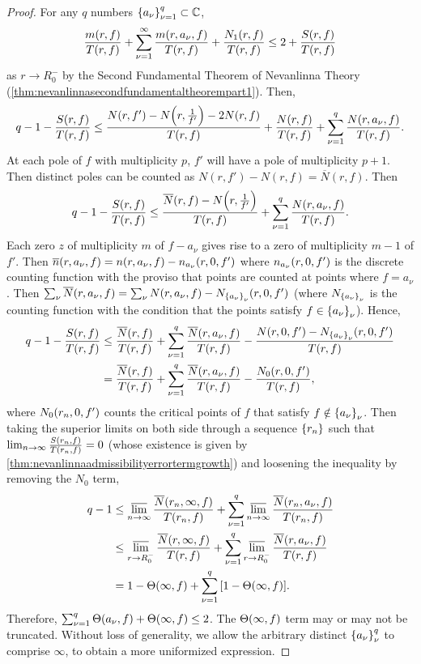\begin{proof}
    For any \(q\) numbers \(\qty{a_\nu}_{\nu=1}^q\subset\mathbb{C}\), \[\frac{m(r,f)}{T(r,f)}+\sum_{\nu=1}^\infty\frac{m\qty(r,a_\nu,f)}{T\qty(r,f)}+\frac{N_1(r,f)}{T(r,f)}\leq 2+\frac{S(r,f)}{T(r,f)}\] as \(r\to R_0^-\) by the Second Fundamental Theorem of Nevanlinna Theory (\cref{thm:nevanlinnasecondfundamentaltheorempart1}). Then, \[q-1-\frac{S(r,f)}{T(r,f)}\leq\frac{N(r,f')-N\qty(r,\tfrac1{f'})-2N(r,f)}{T(r,f)}+\frac{N\qty(r,f)}{T(r,f)}+\sum_{\nu=1}^q\frac{N\qty(r,a_\nu,f)}{T(r,f)}.\]
    At each pole of \(f\) with multiplicity \(p\), \(f'\) will have a pole of multiplicity \(p+1\). Then distinct poles can be counted as \(N(r,f')-N(r,f)=\overline{N}(r,f)\). Then \[q-1-\frac{S(r,f)}{T(r,f)}\leq\frac{\overline{N}(r,f)-N\qty(r,\tfrac1{f'})}{T(r,f)}+\sum_{\nu=1}^q\frac{N\qty(r,a_\nu,f)}{T(r,f)}.\]
    Each zero \(z\) of multiplicity \(m\) of \(f-a_\nu\) gives rise to a zero of multiplicity \(m-1\) of \(f'\). Then \(\overline{n}\qty(r,a_\nu,f)=n\qty(r,a_\nu,f)-n_{a_\nu}\qty(r,0,f')\) where \(n_{a_\nu}\qty(r,0,f')\) is the discrete counting function with the proviso that points are counted at points where \(f=a_\nu\). Then \(\sum_\nu\overline{N}\qty(r,a_\nu,f)=\sum_\nu N\qty(r,a_\nu,f)-N_{\qty{a_\nu}_\nu}\qty(r,0,f')\) (where \(N_{\qty{a_\nu}_\nu}\) is the counting function with the condition that the points satisfy \(f\in\qty{a_\nu}_\nu\)). Hence,
    \begin{align}
        q-1-\frac{S(r,f)}{T(r,f)}&\leq\frac{\overline{N}(r,f)}{T(r,f)}+\sum_{\nu=1}^q\frac{\overline{N}\qty(r,a_\nu,f)}{T(r,f)}-\frac{N\qty(r,0,f')-N_{\qty{a_\nu}_\nu}\qty(r,0,f')}{T\qty(r,f)}\nonumber\\
        &=\frac{\overline{N}(r,f)}{T(r,f)}+\sum_{\nu=1}^q\frac{\overline{N}\qty(r,a_\nu,f)}{T(r,f)}-\frac{N_0\qty(r,0,f')}{T\qty(r,f)},\label{eq:deficiencyrelation_fundamentalinequality}
    \end{align}
    where \(N_0\qty(r_n,0,f')\) counts the critical points of \(f\) that satisfy \(f\notin\qty{a_\nu}_\nu\). Then taking the superior limits on both side through a sequence \(\qty{r_n}\) such that \(\lim_{n\to\infty}\tfrac{S\qty(r_n,f)}{T\qty(r_n,f)}=0\) (whose existence is given by \cref{thm:nevanlinnaadmissibilityerrortermgrowth}) and loosening the inequality by removing the \(N_0\) term,
    \begin{align*}
        q-1&\leq\varlimsup_{n\to\infty}\frac{\overline{N}\qty(r_n,\infty,f)}{T\qty(r_n,f)}+\sum_{\nu=1}^q\varlimsup_{n\to\infty}\frac{\overline{N}\qty(r_n,a_\nu,f)}{T\qty(r_n,f)}\\
        &\leq\varlimsup_{r\to R_0^-}\frac{\overline{N}\qty(r,\infty,f)}{T\qty(r,f)}+\sum_{\nu=1}^q\varlimsup_{r\to R_0^-}\frac{\overline{N}\qty(r,a_\nu,f)}{T\qty(r,f)}\\
        &=1-\Theta(\infty,f)+\sum_{\nu=1}^q\qty[1-\Theta\qty(\infty,f)].
    \end{align*}
    Therefore, \(\textstyle\sum_{\nu=1}^q\Theta\qty(a_\nu,f)+\Theta\qty(\infty,f)\leq 2\). The \(\Theta\qty(\infty,f)\) term may or may not be truncated. Without loss of generality, we allow the arbitrary distinct \(\qty{a_\nu}_{\nu}^q\) to comprise \(\infty\), to obtain a more uniformized expression.


\end{proof}
